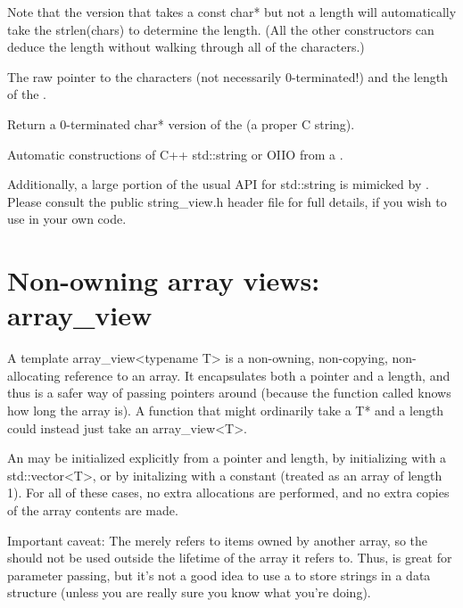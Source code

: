 Note that the version that takes a {\cf const char*} but not a length will
automatically take the {\cf strlen(chars)} to determine the length.  (All
the other constructors can deduce the length without walking through all
of the characters.)
\apiend

The raw pointer to the characters (not necessarily 0-terminated!)
and the length of the \stringview.
\apiend

Return a 0-terminated {\cf char*} version of the \stringview (a proper C
string).
\apiend

Automatic constructions of C++ {\cf std::string} or OIIO \ustring from
a \stringview.
\apiend

\smallskip
\noindent Additionally, a large portion of the usual API for {\cf std::string}
is mimicked by \stringview.  Please consult the public {\cf string_view.h}
header file for full details, if you wish to use \stringview in your own
code.


\section{Non-owning array views: {\cf array_view}}
\label{sec:arrayview}

A {\cf template array\_view<typename T>} is a non-owning, non-copying, non-
allocating reference to an array.  It encapsulates both a pointer and a
length, and thus is a safer way of passing pointers around (because the
function called knows how long the array is). A function that might
ordinarily take a {\cf T*} and a length could instead just take an {\cf
array\_view<T>}.

An \arrayview may be initialized explicitly from a pointer and length, by
initializing with a {\cf std::vector<T>}, or by initalizing with a constant
(treated as an array of length 1). For all of these cases, no extra
allocations are performed, and no extra copies of the array contents are
made.

Important caveat: The \arrayview merely refers to items owned by another
array, so the \arrayview should not be used outside the lifetime of the
array it refers to. Thus, \arrayview is great for parameter passing, but
it's not a good idea to use a \arrayview to store strings in a data
structure (unless you are really sure you know what you're doing).


